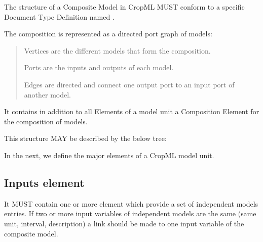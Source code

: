 \documentclass[letterpaper,13pt,english]{sphinxmanual}
\begin{document}
\begin{DUlineblock}{0em}
\item[] The structure of a Composite Model in CropML MUST conform to a specific Document Type Definition
named  .
\end{DUlineblock}

\begin{DUlineblock}{0em}
\item[] The composition is represented as a directed port graph of models:
\end{DUlineblock}
\begin{quote}

\begin{DUlineblock}{0em}
\item[] Vertices are the different models that form the composition.
\item[] Ports are the inputs and outputs of each model.
\item[] Edges are directed and connect one output port to an input port of another model.
\end{DUlineblock}
\end{quote}

\begin{DUlineblock}{0em}
\item[] It contains in addition to all Elements of a model unit a Composition Element for the composition of models.
\item[] This structure MAY be described by the below tree:
\end{DUlineblock}

\noindent{}

\begin{DUlineblock}{0em}
\item[] In the next, we define the major elements of a CropML model unit.
\end{DUlineblock}


\subsection{Inputs element}
\label{\detokenize{user/description:inputs-element}}
It MUST contain one or more  element which provide a set of independent models entries.
If two or more input variables of independent models are the same (same unit, interval, description)
a link should be made to one input variable of the composite model.
\end{document}
